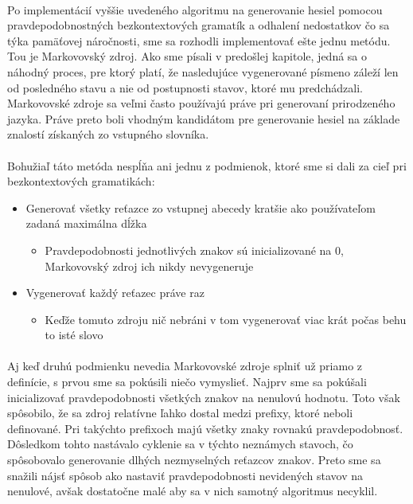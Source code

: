 \paragraph{}
Po implementácií vyššie uvedeného algoritmu na generovanie hesiel pomocou pravdepodobnostných bezkontextových gramatík a odhalení nedostatkov čo sa týka pamäťovej náročnosti, sme sa rozhodli implementovať ešte jednu metódu. Tou je Markovovský zdroj. Ako sme písali v predošlej kapitole, jedná sa o náhodný proces, pre ktorý platí, že nasledujúce vygenerované písmeno záleží len od posledného stavu a nie od postupnosti stavov, ktoré mu predchádzali. Markovovské zdroje sa veľmi často používajú práve pri generovaní prirodzeného jazyka. Práve preto boli vhodným kandidátom pre generovanie hesiel na základe znalostí získaných zo vstupného slovníka. 

\paragraph{}
Bohužiaľ táto metóda nespĺňa ani jednu z podmienok, ktoré sme si dali za cieľ pri bezkontextových gramatikách:
\begin{itemize}
	\item Generovať všetky reťazce zo vstupnej abecedy kratšie ako používateľom zadaná maximálna dĺžka
	\begin{itemize}
		\item Pravdepodobnosti jednotlivých znakov sú inicializované na 0, Markovovský zdroj ich nikdy nevygeneruje
	\end{itemize}
	\item Vygenerovať každý reťazec práve raz
	\begin{itemize}
		\item Keďže tomuto zdroju nič nebráni v tom vygenerovať viac krát počas behu to isté slovo
	\end{itemize}
\end{itemize}

\paragraph{}
Aj keď druhú podmienku nevedia Markovovské zdroje splniť už priamo z definície, s prvou sme sa pokúsili niečo vymyslieť. Najprv sme sa pokúšali inicializovať pravdepodobnosti všetkých znakov na nenulovú hodnotu. Toto však spôsobilo, že sa zdroj relatívne ľahko dostal medzi prefixy, ktoré neboli definované. Pri takýchto prefixoch majú všetky znaky rovnakú pravdepodobnosť. Dôsledkom tohto nastávalo cyklenie sa v týchto neznámych stavoch, čo spôsobovalo generovanie dlhých nezmyselných reťazcov znakov. Preto sme sa snažili nájsť spôsob ako nastaviť pravdepodobnosti nevidených stavov na nenulové, avšak dostatočne malé aby sa v nich samotný algoritmus necyklil.

